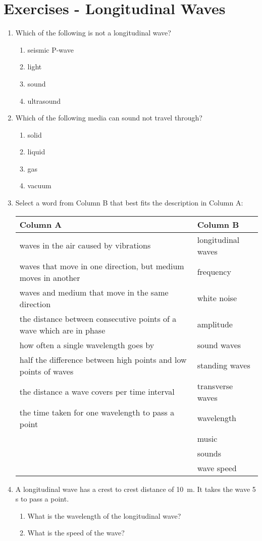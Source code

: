 \section{Exercises - Longitudinal Waves}
\begin{enumerate}
\item{Which of the following is not a longitudinal wave?
\begin{enumerate}
\item{seismic P-wave}
\item{light}
\item{sound}
\item{ultrasound}
\end{enumerate}}

\item{Which of the following media can sound not travel through?
\begin{enumerate}
\item solid
\item liquid
\item gas
\item vacuum
\end{enumerate}}

\item{Select a word from Column B that best fits the description in Column A:

\begin{center}
\begin{tabular}{ll}
\textbf{Column A} & \textbf{Column B} \\ \hline
waves in the air caused by vibrations & longitudinal waves \\
waves that move in one direction, but medium moves in another & frequency \\
waves and medium that move in the same direction & white noise \\
the distance between consecutive points of a wave which are in phase & amplitude \\
how often a single wavelength goes by & sound waves \\
half the difference between high points and low points of waves & standing waves \\
the distance a wave covers per time interval & transverse waves \\
the time taken for one wavelength to pass a point & wavelength \\
& music \\
& sounds \\
& wave speed \\
\end{tabular}
\end{center}
}
\item{A longitudinal wave has a crest to crest distance of 10~m. It takes the wave 5 s to pass a point.
\begin{enumerate}
\item What is the wavelength of the longitudinal wave?
\item What is the speed of the wave?
\end{enumerate}}


\end{enumerate}
